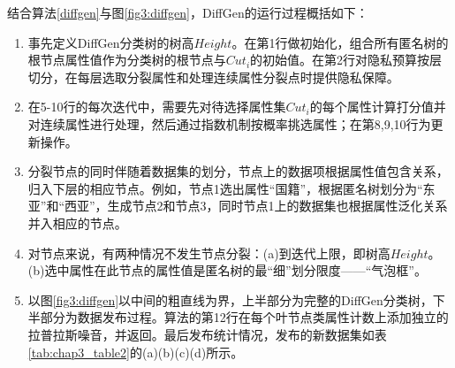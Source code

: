 结合算法\ref{diffgen}与图\ref{fig3:diffgen}，DiffGen的运行过程概括如下：

\begin{enumerate}
	\label{process}
	\item 事先定义DiffGen分类树的树高$Height$。在第1行做初始化，组合所有匿名树的根节点属性值作为分类树的根节点与$Cut_{i}$的初始值。在第2行对隐私预算按层切分，在每层选取分裂属性和处理连续属性分裂点时提供隐私保障。
	\item 在5-10行的每次迭代中，需要先对待选择属性集$Cut_{i}$的每个属性计算打分值并对连续属性进行处理，然后通过指数机制按概率挑选属性；在第8,9,10行为更新操作。
	\item 分裂节点的同时伴随着数据集的划分，节点上的数据项根据属性值包含关系，归入下层的相应节点。例如，节点1选出属性“国籍”，根据匿名树划分为“东亚”和“西亚”，生成节点2和节点3，同时节点1上的数据集也根据属性泛化关系并入相应的节点。
	\item 对节点来说，有两种情况不发生节点分裂：(a)到迭代上限，即树高$Height$。(b)选中属性在此节点的属性值是匿名树的最“细”划分限度——“气泡框”。
	\item 以图\ref{fig3:diffgen}以中间的粗直线为界，上半部分为完整的DiffGen分类树，下半部分为数据发布过程。算法的第12行在每个叶节点类属性计数上添加独立的拉普拉斯噪音，并返回。最后发布统计情况，发布的新数据集如表\ref{tab:chap3_table2}的(a)(b)(c)(d)所示。
\end{enumerate}

